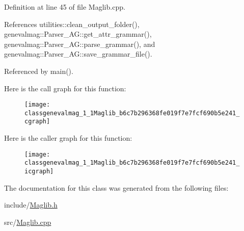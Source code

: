 Definition at line 45 of file Maglib.cpp.

References utilities::clean\_\-output\_\-folder(), genevalmag::Parser\_\-AG::get\_\-attr\_\-grammar(), genevalmag::Parser\_\-AG::parse\_\-grammar(), and genevalmag::Parser\_\-AG::save\_\-grammar\_\-file().

Referenced by main().

Here is the call graph for this function:\nopagebreak
\begin{figure}[H]
\begin{center}
\leavevmode
\texttt{[image: classgenevalmag\_1\_1Maglib\_b6c7b296368fe019f7e7fcf690b5e241\_cgraph]}
\end{center}
\end{figure}


Here is the caller graph for this function:\nopagebreak
\begin{figure}[H]
\begin{center}
\leavevmode
\texttt{[image: classgenevalmag\_1\_1Maglib\_b6c7b296368fe019f7e7fcf690b5e241\_icgraph]}
\end{center}
\end{figure}


The documentation for this class was generated from the following files:\begin{CompactItemize}
\item 
include/\hyperlink{Maglib_8h}{Maglib.h}\item 
src/\hyperlink{Maglib_8cpp}{Maglib.cpp}\end{CompactItemize}
